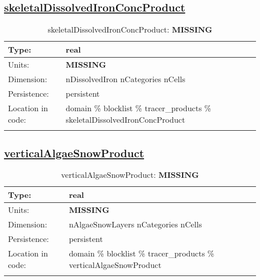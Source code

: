 \subsection[skeletalDissolvedIronConcProduct]{\hyperref[sec:var_tab_tracer_products]{skeletalDissolvedIronConcProduct}}
\label{subsec:var_sec_tracer_products_skeletalDissolvedIronConcProduct}
\begin{center}
\begin{longtable}{| p{2.0in} | p{4.0in} |}
        \hline 
        Type: & real \\
        \hline 
        Units: & {\bf \color{red} MISSING} \\
        \hline 
        Dimension: & nDissolvedIron nCategories nCells \\
        \hline 
        Persistence: & persistent \\
        \hline 
         Location in code: & domain \% blocklist \% tracer\_products \% skeletalDissolvedIronConcProduct \\
         \hline 
    \caption{skeletalDissolvedIronConcProduct: {\bf \color{red} MISSING}}
\end{longtable}
\end{center}
\subsection[verticalAlgaeSnowProduct]{\hyperref[sec:var_tab_tracer_products]{verticalAlgaeSnowProduct}}
\label{subsec:var_sec_tracer_products_verticalAlgaeSnowProduct}
\begin{center}
\begin{longtable}{| p{2.0in} | p{4.0in} |}
        \hline 
        Type: & real \\
        \hline 
        Units: & {\bf \color{red} MISSING} \\
        \hline 
        Dimension: & nAlgaeSnowLayers nCategories nCells \\
        \hline 
        Persistence: & persistent \\
        \hline 
         Location in code: & domain \% blocklist \% tracer\_products \% verticalAlgaeSnowProduct \\
         \hline 
    \caption{verticalAlgaeSnowProduct: {\bf \color{red} MISSING}}
\end{longtable}
\end{center}

